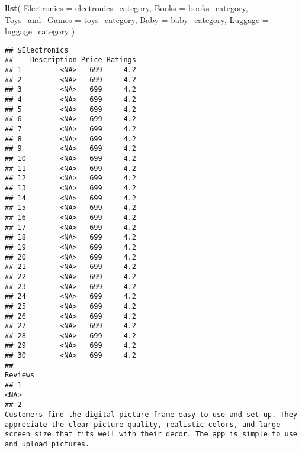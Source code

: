 \documentclass[
]{article}
\newenvironment{Shaded}{\begin{snugshade}}{\end{snugshade}}
\newcommand{\AttributeTok}[1]{\textcolor[rgb]{0.13,0.29,0.53}{#1}}
\newcommand{\FunctionTok}[1]{\textcolor[rgb]{0.13,0.29,0.53}{\textbf{#1}}}
\newcommand{\NormalTok}[1]{#1}
\begin{document}
\begin{Shaded}
\begin{Highlighting}[]
\FunctionTok{list}\NormalTok{(}
  \AttributeTok{Electronics =}\NormalTok{ electronics\_category,}
  \AttributeTok{Books =}\NormalTok{ books\_category,}
  \AttributeTok{Toys\_and\_Games =}\NormalTok{ toys\_category,}
  \AttributeTok{Baby =}\NormalTok{ baby\_category,}
  \AttributeTok{Luggage =}\NormalTok{ luggage\_category}
\NormalTok{)}
\end{Highlighting}
\end{Shaded}

\begin{verbatim}
## $Electronics
##    Description Price Ratings
## 1         <NA>   699     4.2
## 2         <NA>   699     4.2
## 3         <NA>   699     4.2
## 4         <NA>   699     4.2
## 5         <NA>   699     4.2
## 6         <NA>   699     4.2
## 7         <NA>   699     4.2
## 8         <NA>   699     4.2
## 9         <NA>   699     4.2
## 10        <NA>   699     4.2
## 11        <NA>   699     4.2
## 12        <NA>   699     4.2
## 13        <NA>   699     4.2
## 14        <NA>   699     4.2
## 15        <NA>   699     4.2
## 16        <NA>   699     4.2
## 17        <NA>   699     4.2
## 18        <NA>   699     4.2
## 19        <NA>   699     4.2
## 20        <NA>   699     4.2
## 21        <NA>   699     4.2
## 22        <NA>   699     4.2
## 23        <NA>   699     4.2
## 24        <NA>   699     4.2
## 25        <NA>   699     4.2
## 26        <NA>   699     4.2
## 27        <NA>   699     4.2
## 28        <NA>   699     4.2
## 29        <NA>   699     4.2
## 30        <NA>   699     4.2
##                                                                                                                                                                                                                                                                                                                                                                                                                                                                                   Reviews
## 1                                                                                                                                                                                                                                                                                                                                                                                                                                                                                    <NA>
## 2                                                                                                                                                                                                                                                      Customers find the digital picture frame easy to use and set up. They appreciate the clear picture quality, realistic colors, and large screen size that fits well with their decor. The app is simple to use and upload pictures.

\end{verbatim}
\end{document}
